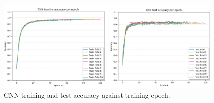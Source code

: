 \begin{figure}[H]
  \centering
  \centerline{\includegraphics[scale=0.55]{Images/cnn_train_test.png}}
  \caption{CNN training and test accuracy against training epoch.}
  \label{mlp_train_test}
\end{figure}



